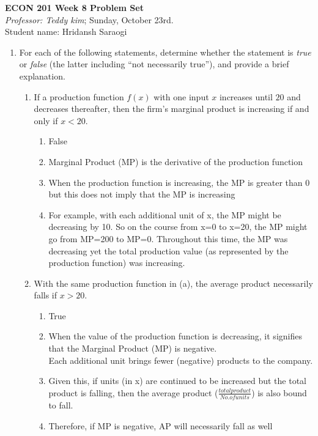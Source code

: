 \documentclass[11pt]{article}
\begin{document}
\begin{center}
\textbf{ECON 201 Week 8 Problem Set}\\
\textit {Professor: Teddy kim};  
Sunday, October 23rd.
\\Student name: Hridansh Saraogi
\end{center}

\begin{enumerate}
\item For each of the following statements, determine whether
the statement is \emph{true} or \emph{false} (the latter including ``not necessarily true''), and provide a brief explanation.
    \begin{enumerate}
        \item If a production function $f(x)$ with one input $x$ increases until $20$ and decreases thereafter, then the firm's marginal product is increasing if and only if $x<20$.
        \begin{enumerate}
            \item False
            \item Marginal Product (MP) is the derivative of the production function
            \item When the production function is increasing, the MP is greater than 0 but this does not imply that the MP is increasing
            \item For example, with each additional unit of x, the MP might be decreasing by 10. So on the course from x=0 to x=20, the MP might go from MP=200 to MP=0. Throughout this time, the MP was decreasing yet the total production value (as represented by the production function) was increasing.
        \end{enumerate}

        \item With the same production function in (a), the average product necessarily falls if $x>20$.
        \begin{enumerate}
            \item True
            \item When the value of the production function is decreasing, it signifies that the Marginal Product (MP) is negative. \\
            Each additional unit brings fewer (negative) products to the company. 
            \item Given this, if units (in x) are continued to be increased but the total product is falling, then the average product ($\frac{total product}{No. of units}$) is also bound to fall.
            \item Therefore, if MP is negative, AP will necessarily fall as well
        \end{enumerate}


\end{enumerate}
\end{enumerate}
\end{document}
